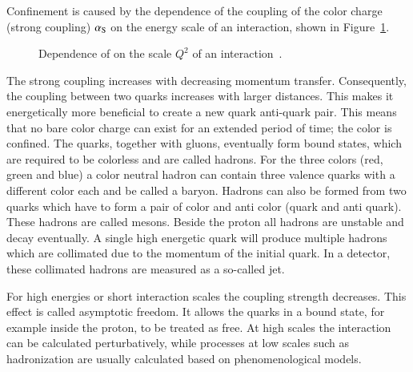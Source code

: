 Confinement is caused by the dependence of the coupling of the color charge (strong coupling) $\alpha_\mathrm{S}$ on the energy scale of an interaction, shown in Figure~\ref{fig:theo_as}.

 
\begin{figure}[htbp!]
  \begin{center}
\caption{Dependence of \as on the scale $Q^2$ of an interaction~\cite{Olive:2016xmw}.
  \label{fig:theo_as}}
  \end{center}
\end{figure}

The strong coupling increases with decreasing momentum transfer. Consequently, the coupling between two quarks increases with larger distances. This makes it energetically more beneficial to create a new quark anti-quark pair.
This means that no bare color charge can exist for an extended period of time; the color is confined. The quarks, together with gluons, eventually form bound states, which are required to be colorless and are called hadrons. 
For the three colors (red, green and blue) a color neutral hadron can contain three valence quarks with a different color each and be called a baryon. Hadrons can also be formed from two quarks which have to form a pair of color
and anti color (quark and anti quark). These hadrons are called mesons. Beside the proton all hadrons are unstable and decay eventually.
A single high energetic quark will produce multiple hadrons which are collimated due to the momentum of the initial quark. In a detector, these collimated hadrons are measured as a so-called jet. 

For high energies or short interaction scales the coupling strength decreases. This effect is called asymptotic freedom. It allows the quarks in a bound state, for example inside the proton, to be treated as free.
At high scales the interaction can be calculated perturbatively, while processes at low scales such as hadronization are usually calculated based on phenomenological models.


